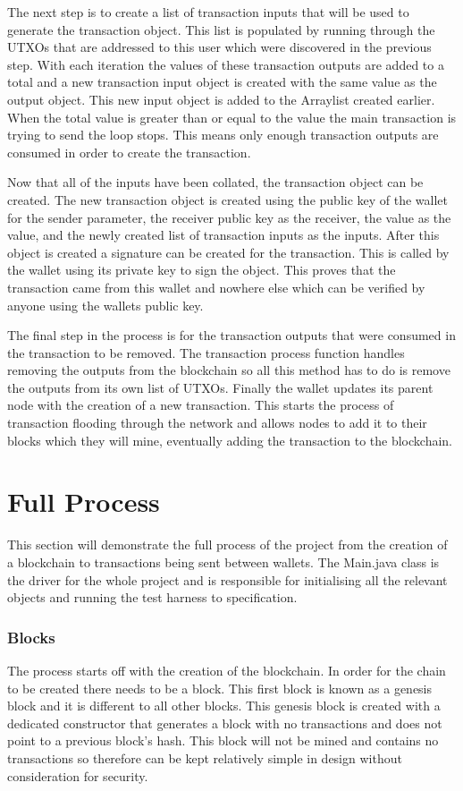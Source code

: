 \documentclass{l4proj}
\begin{document}
The next step is to create a list of transaction inputs that will be used to generate the transaction object.
This list is populated by running through the UTXOs that are addressed to this user which were discovered in 
the previous step. With each iteration the values of these transaction outputs are added to a total and a new 
transaction input object is created with the same value as the output object. This new input object is added
to the Arraylist created earlier. When the total value is greater than or equal to the value the main transaction
is trying to send the loop stops. This means only enough transaction outputs are consumed in order to create the
transaction.

Now that all of the inputs have been collated, the transaction object can be created. The new transaction 
object is created using the public key of the wallet for the sender parameter, the receiver public key as the
receiver, the value as the value, and the newly created list of transaction inputs as the inputs. After this 
object is created a signature can be created for the transaction. This is called by the wallet using its private
key to sign the object. This proves that the transaction came from this wallet and nowhere else which can be 
verified by anyone using the wallets public key.

The final step in the process is for the transaction outputs that were consumed in the transaction to be removed.
The transaction process function handles removing the outputs from the blockchain so all this method has to do
is remove the outputs from its own list of UTXOs. Finally the wallet updates its parent node with the creation
of a new transaction. This starts the process of transaction flooding through the network and allows nodes to 
add it to their blocks which they will mine, eventually adding the transaction to the blockchain.



\section{Full Process}
This section will demonstrate the full process of the project from the creation of a blockchain to transactions
being sent between wallets. The Main.java class is the driver for the whole project and is responsible for
initialising all the relevant objects and running the test harness to specification.

\subsubsection{Blocks}
The process starts off with the creation of the blockchain. In order for the chain to be created there needs to be
a block. This first block is known as a genesis block and it is different to all other blocks. This genesis block
is created with a dedicated constructor that generates a block with no transactions and does not point to a previous
block's hash. This block will not be mined and contains no transactions so therefore can be kept relatively simple
in design without consideration for security. 
\end{document}
